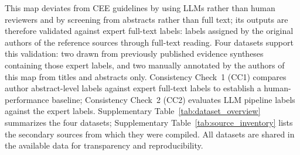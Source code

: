 \documentclass[12pt]{article}
\begin{document}
This map deviates from CEE guidelines by using LLMs rather than human 
reviewers and by screening from abstracts rather than full text; its outputs are therefore validated against expert full-text labels: labels assigned by the original authors of the reference sources through full-text reading. Four datasets support this validation: two drawn from previously published evidence syntheses containing those expert labels, and two manually annotated by the authors of this map from titles and abstracts only. Consistency Check~1 (CC1) compares author abstract-level labels against expert full-text labels to establish a human-performance baseline; Consistency Check~2 (CC2) evaluates LLM pipeline labels against the expert labels. Supplementary Table~\ref{tab:dataset_overview} summarizes the four datasets; Supplementary Table~\ref{tab:source_inventory} lists the secondary sources from which they were compiled. All datasets are shared in the available data for transparency and reproducibility.
\end{document}
